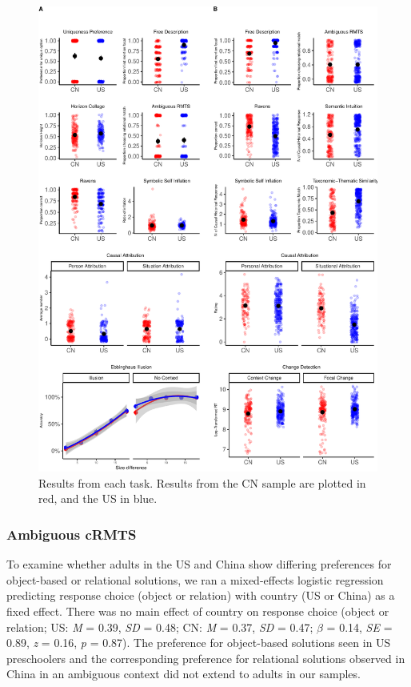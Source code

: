 \documentclass[
  man,floatsintext]{apa6}
\begin{document}
\begin{figure}
\centering
\includegraphics{CCRR_manuscript_files/figure-latex/unnamed-chunk-13-1.pdf}
\caption{\label{fig:unnamed-chunk-13}Results from each task. Results from the CN sample are plotted in red, and the US in blue.}
\end{figure}

\hypertarget{ambiguous-crmts-1}{%
\subsubsection{Ambiguous cRMTS}\label{ambiguous-crmts-1}}

To examine whether adults in the US and China show differing preferences for object-based or relational solutions, we ran a mixed-effects logistic regression predicting response choice (object or relation) with country (US or China) as a fixed effect. There was no main effect of country on response choice (object or relation; US: \emph{M} = 0.39, \emph{SD} = 0.48; CN: \emph{M} = 0.37, \emph{SD} = 0.47; \(\beta\) = 0.14, \emph{SE} = 0.89, \emph{z} = 0.16, \emph{p} = 0.87). The preference for object-based solutions seen in US preschoolers and the corresponding preference for relational solutions observed in China in an ambiguous context did not extend to adults in our samples.
\end{document}
